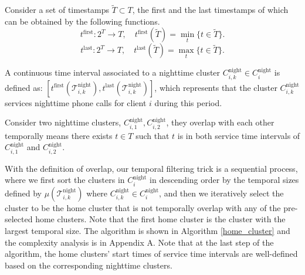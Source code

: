 \begin{function}
Consider a set of timestamps $\tilde{T} \subset T$, the first and the last timestamps of which can be obtained by the following functions.
$$
t^{\text{first}}: 2^{T} \rightarrow T, \quad t^{\text{first}}(\tilde{T}) = \min_t \{t \in \tilde{T}\}.
$$
$$
t^{\text{last}}: 2^{T} \rightarrow T, \quad t^{\text{last}}(\tilde{T}) = \max_t \{t \in \tilde{T}\}.
$$
\end{function}

\begin{definition}
A continuous time interval associated to a nighttime cluster $C^{\text{night}}_{i, k} \in C^{\text{night}}_i$ is defined as: $[t^{\text{first}}(\mathcal{T}^{\text{night}}_{i, k}), t^{\text{last}}(\mathcal{T}^{\text{night}}_{i, k})]$, which represents that the cluster $C^{\text{night}}_{i, k}$ services nighttime phone calls for client $i$ during this period.
\end{definition}

\begin{definition}
Consider two nighttime clusters, $C^{\text{night}}_{i, 1}, C^{\text{night}}_{i, 2}$, they overlap with each other temporally means there exists $t \in T$ such that $t$ is in both service time intervals of $C^{\text{night}}_{i, 1}$ and $C^{\text{night}}_{i, 2}$.
\end{definition}


With the definition of overlap, our temporal filtering trick is a sequential process, where we first sort the clusters in $C^{\text{night}}_i$ in descending order by the temporal sizes defined by $\mu(\mathcal{T}^{\text{night}}_{i, k})$ where $C^{\text{night}}_{i, k} \in C^{\text{night}}_i$, and then we iteratively select the cluster to be the home cluster that is not temporally overlap with any of the pre-selected home clusters. Note that the first home cluster is the cluster with the largest temporal size. The algorithm is shown in Algorithm \ref{home_cluster} and the complexity analysis is in Appendix A. Note that at the last step of the algorithm, the home clusters' start times of service time intervals are well-defined based on the corresponding nighttime clusters.


